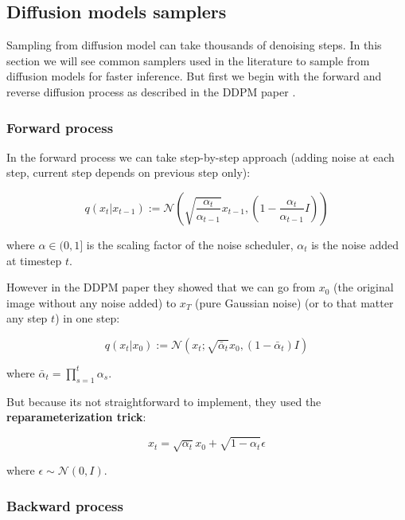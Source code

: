 \subsection{Diffusion models samplers}
\label{appendix:dm_samplers}

Sampling from diffusion model can take thousands of denoising steps. In this section we will see common samplers used in the literature to sample from diffusion models for faster inference. But first we begin with the forward and reverse diffusion process as described in the DDPM paper \cite{ddpm}.








\subsubsection*{Forward process}

In the forward process we can take step-by-step approach (adding noise at each step, current step depends on previous step only):

\[ q(x_t | x_{t-1}) := \mathcal{N} \left( \sqrt{\frac{\alpha_t}{\alpha_{t-1}}} x_{t-1}, \left( 1 - \frac{\alpha_t}{\alpha_{t-1}} I \right) \right) \]

where $\alpha \in (0, 1]$ is the scaling factor of the noise scheduler, $\alpha_t$ is the noise added at timestep $t$.

However in the DDPM paper \cite{ddpm} they showed that we can go from $x_0$ (the original image without any noise added) to $x_T$ (pure Gaussian noise) (or to that matter any step $t$) in one step:

\[ q(x_t | x_0) := \mathcal{N} \left( x_t; \sqrt{\bar{\alpha}_t} x_0, (1 - \bar{\alpha}_t) I \right) \]

where $\bar{\alpha}_t = \prod_{s=1}^{t} \alpha_s$.

But because its not straightforward to implement, they used the \textbf{reparameterization trick}:

\begin{equation}
    x_t = \sqrt{\alpha_t} x_0 + \sqrt{1 - \alpha_t} \epsilon
    \label{eq:appendix_ddpm_reparam_trick}
\end{equation}

where $\epsilon \sim \mathcal{N} (0, I)$. 








\subsubsection*{Backward process}

